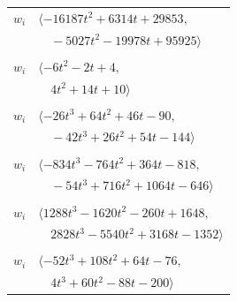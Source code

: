 \documentclass[11pt]{article}
\begin{document}
\begin{longtable}{@{}ll@{}}
$w_i$ & $\langle -16187t^{2}+6314t+29853,$\\
 & $\quad -5027t^{2}-19978t+95925\rangle$\\
\addlinespace[2pt]
\multicolumn{2}{@{}p{0.97\textwidth}@{}}{$i=80$, $D_i=1$, $\rho_{ij}$: $2{:}2, \allowbreak 27{:}1, \allowbreak 89{:}1, \allowbreak 92{:}1$}\\
$w_i$ & $\langle -6t^{2}-2t+4,$\\
 & $\quad 4t^{2}+14t+10\rangle$\\
\addlinespace[2pt]
\multicolumn{2}{@{}p{0.97\textwidth}@{}}{$i=81$, $D_i=1$, $\rho_{ij}$: $1{:}2, \allowbreak 3{:}1, \allowbreak 11{:}1, \allowbreak 18{:}1, \allowbreak 33{:}2, \allowbreak 36{:}1, \allowbreak 37{:}2, \allowbreak 56{:}2, \allowbreak 60{:}1, \allowbreak 67{:}2, \allowbreak 90{:}2, \allowbreak 91{:}1, \allowbreak 95{:}1$}\\
$w_i$ & $\langle -26t^{3}+64t^{2}+46t-90,$\\
 & $\quad -42t^{3}+26t^{2}+54t-144\rangle$\\
\addlinespace[2pt]
\multicolumn{2}{@{}p{0.97\textwidth}@{}}{$i=82$, $D_i=1$, $\rho_{ij}$: $0{:}1, \allowbreak 11{:}1, \allowbreak 27{:}1, \allowbreak 50{:}1, \allowbreak 60{:}1, \allowbreak 61{:}2, \allowbreak 63{:}2, \allowbreak 67{:}1, \allowbreak 70{:}1, \allowbreak 74{:}2, \allowbreak 76{:}2, \allowbreak 83{:}2, \allowbreak 88{:}1, \allowbreak 96{:}2$}\\
$w_i$ & $\langle -834t^{3}-764t^{2}+364t-818,$\\
 & $\quad -54t^{3}+716t^{2}+1064t-646\rangle$\\
\addlinespace[2pt]
\multicolumn{2}{@{}p{0.97\textwidth}@{}}{$i=83$, $D_i=1$, $\rho_{ij}$: $18{:}1, \allowbreak 19{:}1, \allowbreak 36{:}1, \allowbreak 56{:}1, \allowbreak 67{:}2, \allowbreak 71{:}2, \allowbreak 77{:}1, \allowbreak 82{:}1, \allowbreak 88{:}2, \allowbreak 89{:}2, \allowbreak 90{:}2$}\\
$w_i$ & $\langle 1288t^{3}-1620t^{2}-260t+1648,$\\
 & $\quad 2828t^{3}-5540t^{2}+3168t-1352\rangle$\\
\addlinespace[2pt]
\multicolumn{2}{@{}p{0.97\textwidth}@{}}{$i=84$, $D_i=1$, $\rho_{ij}$: $2{:}1, \allowbreak 11{:}1, \allowbreak 19{:}2, \allowbreak 27{:}2, \allowbreak 34{:}1, \allowbreak 39{:}2, \allowbreak 70{:}1, \allowbreak 78{:}2, \allowbreak 89{:}1, \allowbreak 90{:}1$}\\
$w_i$ & $\langle -52t^{3}+108t^{2}+64t-76,$\\
 & $\quad 4t^{3}+60t^{2}-88t-200\rangle$\\

\end{longtable}
\end{document}
